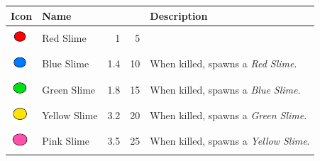 \begin{table}[H]
    \centering
    \begin{tabular}{m{9mm}m{25mm}D{.}{.}{-1}rm{0.48\textwidth}}
        \toprule
        \textbf{Icon}                                                                 & \textbf{Name}                          &  &  & \textbf{Description}                                                                                                                                \\
        \midrule
        \includegraphics[height=7mm]{img/Icons/Attackers/Red Slime.png}               & \footnotesize{Red Slime}               & 1                   & 5                &                                                                                                                                                     \\
        \includegraphics[height=7mm]{img/Icons/Attackers/Blue Slime.png}              & \footnotesize{Blue Slime}              & 1.4                 & 10               & \footnotesize{When killed, spawns a \emph{Red Slime}.}                                                                                              \\
        \includegraphics[height=7mm]{img/Icons/Attackers/Green Slime.png}             & \footnotesize{Green Slime}             & 1.8                 & 15               & \footnotesize{When killed, spawns a \emph{Blue Slime}.}                                                                                             \\
        \includegraphics[height=7mm]{img/Icons/Attackers/Yellow Slime.png}            & \footnotesize{Yellow Slime}            & 3.2                 & 20               & \footnotesize{When killed, spawns a \emph{Green Slime}.}                                                                                            \\
        \includegraphics[height=7mm]{img/Icons/Attackers/Pink Slime.png}              & \footnotesize{Pink Slime}              & 3.5                 & 25               & \footnotesize{When killed, spawns a \emph{Yellow Slime}.}                                                                                           \\

\end{tabular}
\end{table}
